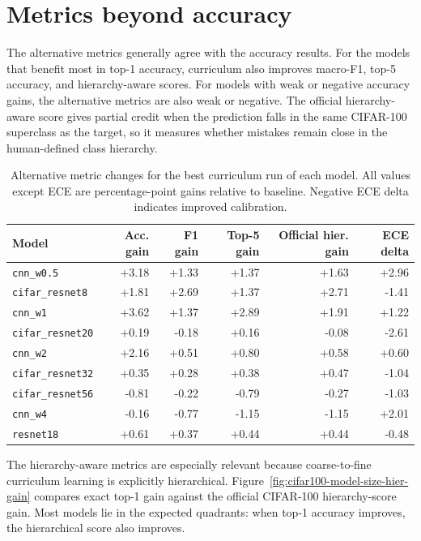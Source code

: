 \section{Metrics beyond accuracy}

The alternative metrics generally agree with the accuracy results. For the
models that benefit most in top-1 accuracy, curriculum also improves macro-F1,
top-5 accuracy, and hierarchy-aware scores. For models with weak or negative
accuracy gains, the alternative metrics are also weak or negative. The official
hierarchy-aware score gives partial credit when the prediction falls in the same
CIFAR-100 superclass as the target, so it measures whether mistakes remain close
in the human-defined class hierarchy.

\begin{table}[h]
\centering
\small
\begin{tabular}{lrrrrr}
\hline
Model & Acc. gain & F1 gain & Top-5 gain & Official hier. gain & ECE delta \\
\hline
\texttt{cnn\_w0.5} & +3.18 & +1.33 & +1.37 & +1.63 & +2.96 \\
\texttt{cifar\_resnet8} & +1.81 & +2.69 & +1.37 & +2.71 & -1.41 \\
\texttt{cnn\_w1} & +3.62 & +1.37 & +2.89 & +1.91 & +1.22 \\
\texttt{cifar\_resnet20} & +0.19 & -0.18 & +0.16 & -0.08 & -2.61 \\
\texttt{cnn\_w2} & +2.16 & +0.51 & +0.80 & +0.58 & +0.60 \\
\texttt{cifar\_resnet32} & +0.35 & +0.28 & +0.38 & +0.47 & -1.04 \\
\texttt{cifar\_resnet56} & -0.81 & -0.22 & -0.79 & -0.27 & -1.03 \\
\texttt{cnn\_w4} & -0.16 & -0.77 & -1.15 & -1.15 & +2.01 \\
\texttt{resnet18} & +0.61 & +0.37 & +0.44 & +0.44 & -0.48 \\
\hline
\end{tabular}
\caption{Alternative metric changes for the best curriculum run of each model.
All values except ECE are percentage-point gains relative to baseline. Negative
ECE delta indicates improved calibration.}
\label{tab:cifar100-model-size-alt-metrics}
\end{table}

The hierarchy-aware metrics are especially relevant because coarse-to-fine
curriculum learning is explicitly hierarchical. Figure~\ref{fig:cifar100-model-size-hier-gain}
compares exact top-1 gain against the official CIFAR-100 hierarchy-score gain.
Most models lie in the expected quadrants: when top-1 accuracy improves, the
hierarchical score also improves.

